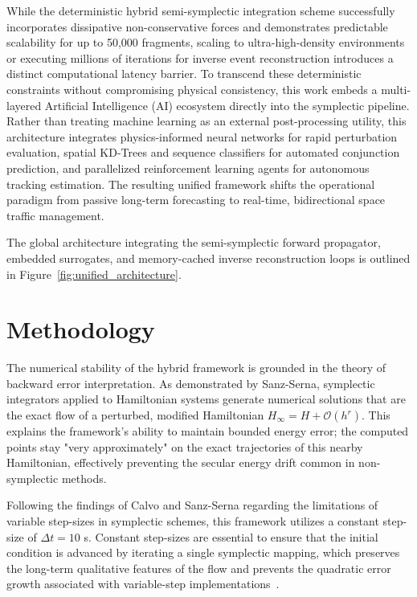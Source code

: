 \documentclass[letterpaper, preprint, 11pt]{AAS}
\begin{document}
While the deterministic hybrid semi-symplectic integration scheme successfully incorporates dissipative non-conservative forces and demonstrates predictable scalability for up to 50,000 fragments, scaling to ultra-high-density environments or executing millions of iterations for inverse event reconstruction introduces a distinct computational latency barrier. To transcend these deterministic constraints without compromising physical consistency, this work embeds a multi-layered Artificial Intelligence (AI) ecosystem directly into the symplectic pipeline. Rather than treating machine learning as an external post-processing utility, this architecture integrates physics-informed neural networks for rapid perturbation evaluation, spatial KD-Trees and sequence classifiers for automated conjunction prediction, and parallelized reinforcement learning agents for autonomous tracking estimation. The resulting unified framework shifts the operational paradigm from passive long-term forecasting to real-time, bidirectional space traffic management.

The global architecture integrating the semi-symplectic forward propagator, embedded surrogates, and memory-cached inverse reconstruction loops is outlined in Figure~\ref{fig:unified_architecture}.

\section{Methodology}

The numerical stability of the hybrid framework is grounded in the theory of backward error interpretation. As demonstrated by Sanz-Serna, symplectic integrators applied to Hamiltonian systems generate numerical solutions that are the exact flow of a perturbed, modified Hamiltonian $H_{\infty} = H + \mathcal{O}(h^r)$. This explains the framework's ability to maintain bounded energy error; the computed points stay "very approximately" on the exact trajectories of this nearby Hamiltonian, effectively preventing the secular energy drift common in non-symplectic methods.

Following the findings of Calvo and Sanz-Serna regarding the limitations of variable step-sizes in symplectic schemes, this framework utilizes a constant step-size of $\Delta t = 10$ s. Constant step-sizes are essential to ensure that the initial condition is advanced by iterating a single symplectic mapping, which preserves the long-term qualitative features of the flow and prevents the quadratic error growth associated with variable-step implementations~\cite{sanz-serna_symplectic_1992}.
\end{document}
